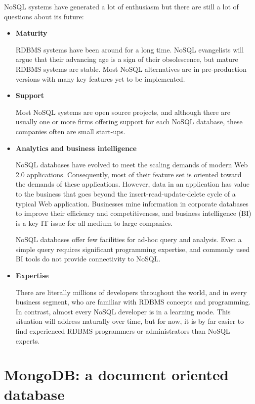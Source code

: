 NoSQL systems have generated a lot of enthusiasm but there are still a lot of questions about its future:

\begin{itemize}

\item \textbf{Maturity}

RDBMS systems have been around for a long time. NoSQL evangelists will argue that their advancing age is a sign of their obsolescence, but mature RDBMS systems are stable. Most NoSQL alternatives are in pre-production versions with many key features yet to be implemented.

\item \textbf{Support}

Most NoSQL systems are open source projects, and although there are usually one or more firms offering support for each NoSQL database, these companies often are small start-ups.
 
\item \textbf{Analytics and business intelligence}

NoSQL databases have evolved to meet the scaling demands of modern Web 2.0 applications. Consequently, most of their feature set is oriented toward the demands of these applications. However, data in an application has value to the business that goes beyond the insert-read-update-delete cycle of a typical Web application. Businesses mine information in corporate databases to improve their efficiency and competitiveness, and business intelligence (BI) is a key IT issue for all medium to large companies.

NoSQL databases offer few facilities for ad-hoc query and analysis. Even a simple query requires significant programming expertise, and commonly used BI tools do not provide connectivity to NoSQL.

\item \textbf{Expertise}

There are literally millions of developers throughout the world, and in every business segment, who are familiar with RDBMS concepts and programming. In contrast, almost every NoSQL developer is in a learning mode. This situation will address naturally over time, but for now, it is by far easier to find experienced RDBMS programmers or administrators than NoSQL experts.

\end{itemize}

\section{MongoDB: a document oriented database}

